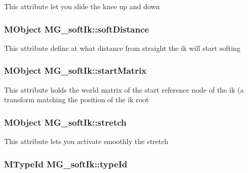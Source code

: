 This attribute let you slide the knee up and down \hypertarget{class_m_g__soft_ik_a4ab55903fd1f7ac8b66438ad9ea07640}{
\subsubsection[{soft\-Distance}]{\setlength{\rightskip}{0pt plus 5cm}M\-Object M\-G\-\_\-soft\-Ik\-::soft\-Distance\hspace{0.3cm}{\ttfamily [static]}}}\label{class_m_g__soft_ik_a4ab55903fd1f7ac8b66438ad9ea07640}
This attribute define at what distance from straight the ik will start softing \hypertarget{class_m_g__soft_ik_aee30f7b1a9cd369af0797452171a1656}{
\subsubsection[{start\-Matrix}]{\setlength{\rightskip}{0pt plus 5cm}M\-Object M\-G\-\_\-soft\-Ik\-::start\-Matrix\hspace{0.3cm}{\ttfamily [static]}}}\label{class_m_g__soft_ik_aee30f7b1a9cd369af0797452171a1656}
This attribute holds the world matrix of the start reference node of the ik (a transform matching the position of the ik root \hypertarget{class_m_g__soft_ik_a72bd64a9986cbb29cec8953ef4199289}{
\subsubsection[{stretch}]{\setlength{\rightskip}{0pt plus 5cm}M\-Object M\-G\-\_\-soft\-Ik\-::stretch\hspace{0.3cm}{\ttfamily [static]}}}\label{class_m_g__soft_ik_a72bd64a9986cbb29cec8953ef4199289}
This attribute lets you activate smoothly the stretch \hypertarget{class_m_g__soft_ik_aa83471e41222b306261d20f6851548b8}{
\subsubsection[{type\-Id}]{\setlength{\rightskip}{0pt plus 5cm}M\-Type\-Id M\-G\-\_\-soft\-Ik\-::type\-Id\hspace{0.3cm}{\ttfamily [static]}}}\label{class_m_g__soft_ik_aa83471e41222b306261d20f6851548b8}

